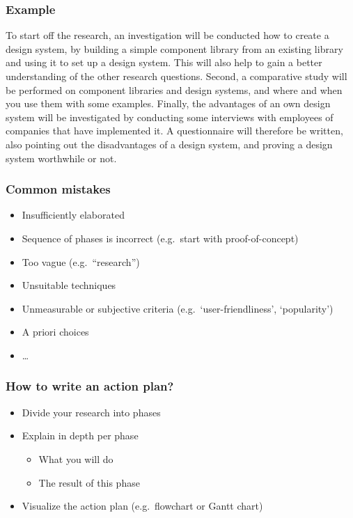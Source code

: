 \documentclass[aspectratio=169]{beamer}
\begin{document}
\begin{frame}
  \frametitle{Example}
  \small
  To start off the research, an investigation will be conducted how to create a design system, by building a simple component library from an existing library and using it to set up a design system. This will also help to gain a better understanding of the other research questions. Second, a comparative study will be performed on component libraries and design systems, and where and when you use them with some examples. Finally, the advantages of an own design system will be investigated by conducting some interviews with employees of companies that have implemented it. A questionnaire will therefore be written, also pointing out the disadvantages of a design system, and proving a design system worthwhile or not.

\end{frame}

\begin{frame}
  \frametitle{Common mistakes}

  \begin{itemize}
    \item Insufficiently elaborated
    \item Sequence of phases is incorrect (e.g.\ start with proof-of-concept)
    \item Too vague (e.g.\ ``research'')
    \item Unsuitable techniques
    \item Unmeasurable or subjective criteria (e.g.\ `user-friendliness', `popularity')
    \item A priori choices
    \item \ldots
  \end{itemize}

\end{frame}


\begin{frame}
  \frametitle{How to write an action plan?}

  \begin{itemize}
    \item Divide your research into phases
    \item Explain in depth per phase
          \begin{itemize}
            \item What you will do
            \item The result of this phase
          \end{itemize}
    \item Visualize the action plan (e.g.\ flowchart or Gantt chart)
  \end{itemize}
\end{frame}
\end{document}
